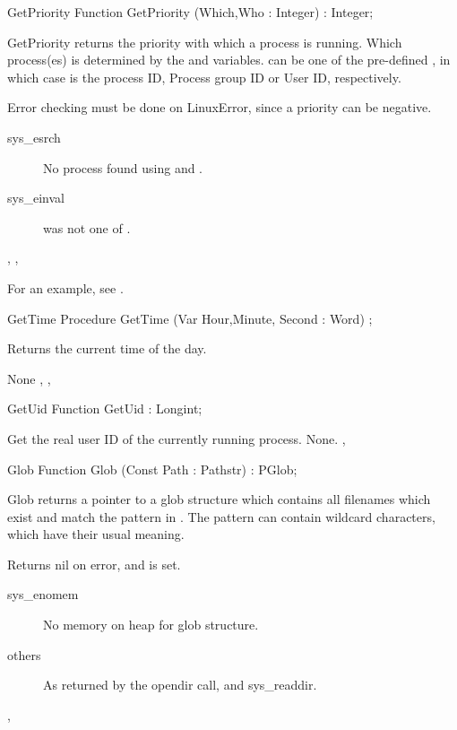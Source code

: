 \html{}
\begin{function}{GetPriority}
\Declaration
Function GetPriority (Which,Who : Integer) : Integer;

\Description

GetPriority returns the priority with which a process is running.
Which process(es) is determined by the  and  variables.
 can be one of the pre-defined , in which case  is the process ID, Process group ID or
User ID, respectively.

\Errors

 Error checking must be done on LinuxError, since a priority can be negative.
 \begin{description}
 \item[sys\_esrch] No process found using  and .
 \item[sys\_einval]  was not one of .
 \end{description}
 
\SeeAlso
{}, , 
\end{function}
For an example, see .
\begin{procedure}{GetTime}
\Declaration
Procedure GetTime  (Var Hour,Minute, Second : Word) ;

\Description

Returns the current time of the day.

\Errors
None
\SeeAlso
{}, ,  
\end{procedure}
\html{}
\begin{function}{GetUid}
\Declaration
Function GetUid  : Longint;

\Description
 Get the real user ID of the currently running process.
\Errors
None.
\SeeAlso
{},  
\end{function}
\html{}
\begin{function}{Glob}
\Declaration
Function Glob (Const Path : Pathstr) : PGlob;

\Description

Glob returns a pointer to a glob structure which contains all filenames which
exist and match the pattern in .
The pattern can contain wildcard characters, which have their
usual meaning.

\Errors
 Returns nil on error, and  is set.
\begin{description}
\item[sys\_enomem] No memory on heap for glob structure.
\item[others] As returned by the opendir call, and sys\_readdir.
\end{description}

\SeeAlso
{},  
\end{function}
